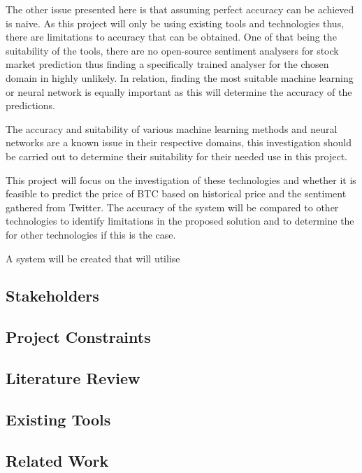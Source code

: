 \documentclass[oneside, 10pt]{article}
\begin{document}
		The other issue presented here is that assuming perfect accuracy can be achieved is naive. As this project will only be using existing tools and technologies thus, there are limitations to accuracy that can be obtained. One of that being the suitability of the tools, there are no open-source sentiment analysers for stock market prediction thus finding a specifically trained analyser for the chosen domain in highly unlikely. In relation, finding the most suitable machine learning or neural network is equally important as this will determine the accuracy of the predictions.
		
		The accuracy and suitability of various machine learning methods and neural networks are a known issue in their respective domains, this investigation should be carried out to determine their suitability for their needed use in this project.
		
		This project will focus on the investigation of these technologies and whether it is feasible to predict the price of BTC based on historical price and the sentiment gathered from Twitter. The accuracy of the system will be compared to other technologies to identify limitations in the proposed solution and to determine the for other technologies if this is the case. 
		
		A system will be created that will utilise  
		
		\subsection{Stakeholders}\label{stakeholders}
		
		\subsection{Project Constraints}\label{constraints}
	
	\newpage
	
	\begin{center}
		\section{Literature Review}\label{literature}
	\end{center}
			\subsection{Existing Tools}
			
			\subsection{Related Work}
			
\end{document}
